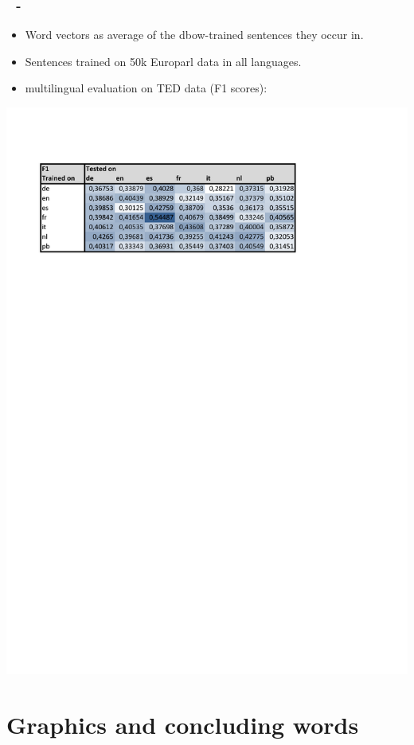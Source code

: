 \documentclass{beamer}
\newenvironment{dia}
{
\begin{frame}[fragile, environment=dia]
\frametitle{\insertsection
\ifx\insertsubsection\empty\else
      \,~-~\insertsubsection             %
   \fi}
}
{
\end{frame}
}
\begin{document}
\begin{dia}
\begin{itemize}
\item Word vectors as average of the dbow-trained sentences they occur in.
\item Sentences trained on 50k Europarl data in all languages.
\item multilingual evaluation on TED data (F1 scores):
\end{itemize}
\includegraphics[width=\textwidth]{figures/multilingdbow}
\end{dia}







\section{Graphics and concluding words}
\end{document}
